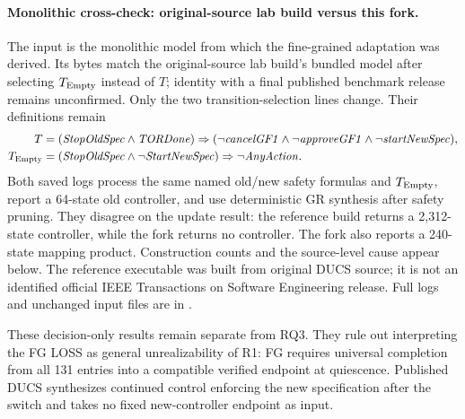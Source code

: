 \documentclass[11pt]{article}
\begin{document}
\paragraph{Monolithic cross-check: original-source lab build versus this fork.}
The input is the monolithic model from which the fine-grained adaptation was derived. Its bytes match the original-source lab build's bundled model after selecting $T_{\rm Empty}$ instead of $T$; identity with a final published benchmark release remains unconfirmed. Only the two transition-selection lines change. Their definitions remain
\[
\begin{aligned}
T&=(\mathit{StopOldSpec}\land\mathit{TORDone})\Rightarrow
 (\neg\mathit{cancelGF1}\land\neg\mathit{approveGF1}
 \land\neg\mathit{startNewSpec}),\\
T_{\rm Empty}&=(\mathit{StopOldSpec}\land\neg\mathit{StartNewSpec})
 \Rightarrow\neg\mathit{AnyAction}.
\end{aligned}
\]
Both saved logs process the same named old/new safety formulas and $T_{\rm Empty}$, report a 64-state old controller, and use deterministic GR synthesis after safety pruning. They disagree on the update result: the reference build returns a 2,312-state controller, while the fork returns no controller. The fork also reports a 240-state mapping product. Construction counts and the source-level cause appear below. The reference executable was built from original DUCS source; it is not an identified official IEEE Transactions on Software Engineering release. Full logs and unchanged input files are in .

These decision-only results remain separate from RQ3. They rule out interpreting the FG LOSS as general unrealizability of R1: FG requires universal completion from all 131 entries into a compatible verified endpoint at quiescence. Published DUCS synthesizes continued control enforcing the new specification after the switch and takes no fixed new-controller endpoint as input.
\end{document}
